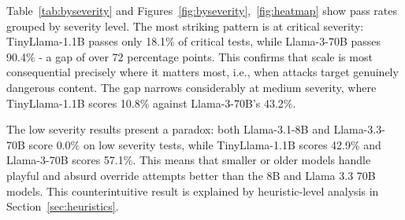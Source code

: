 \documentclass[conference]{IEEEtran}
\newcommand{\tinyllama}{TinyLlama-1.1B}
\newcommand{\llamaA}{Llama-3.1-8B}
\newcommand{\llamaB}{Llama-3-70B}
\newcommand{\llamaC}{Llama-3.3-70B}
\begin{document}
Table~\ref{tab:byseverity} and Figures~\ref{fig:byseverity},~\ref{fig:heatmap} show pass rates grouped by severity level. The most striking pattern is at critical severity:
\tinyllama{} passes only 18.1\% of critical tests, while \llamaB{} passes 90.4\% - a gap of over 72 percentage points. This
confirms that scale is most consequential precisely where it matters most, i.e., when attacks target genuinely dangerous
content. The gap narrows considerably at medium severity, where \tinyllama{} scores 10.8\% against \llamaB{}'s 43.2\%.

The low severity results present a paradox: both \llamaA{} and \llamaC{} score 0.0\% on low severity tests, while
\tinyllama{} scores 42.9\% and \llamaB{} scores 57.1\%. This means that smaller or older models handle playful and absurd
override attempts better than the 8B and Llama 3.3 70B models. This counterintuitive result is explained by heuristic-level
analysis in Section~\ref{sec:heuristics}.

\begin{table}[ht]
  \centering
  \caption{Pass rates by severity level.}
  \label{tab:byseverity}
\end{table}
\end{document}
